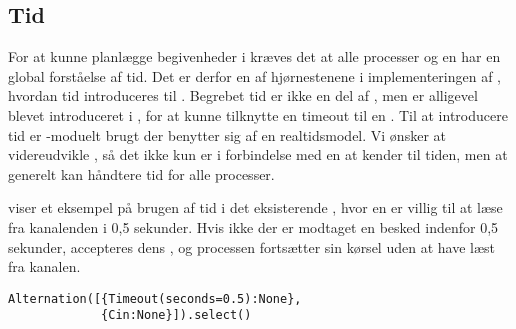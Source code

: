 \subsection{Tid} \label{sec:tid}
For at kunne planlægge begivenheder i \des kræves det at alle processer og \sched en har en global forståelse af tid.  Det er derfor en af hjørnestenene i implementeringen af \des, hvordan tid introduceres til \pycsp.  
Begrebet tid er ikke en del af \csp, men er alligevel blevet introduceret i \pycsp, for  at  kunne tilknytte en timeout til en . Til at introducere tid er -moduelt brugt der benytter sig af en realtidsmodel.  Vi ønsker
at videreudvikle \pycsp, så det ikke kun er i forbindelse med en  at \pycsp kender til tiden, men at \pycsp generelt kan håndtere tid for alle
processer.
 
 viser et eksempel på brugen af tid i det eksisterende \pycsp, hvor en  er villig
til at læse fra kanalenden  i 0,5 sekunder. Hvis ikke der
er modtaget en besked indenfor 0,5 sekunder, accepteres dens ,
og processen fortsætter sin kørsel uden at have læst fra kanalen.

\begin{lstlisting}[float=hbtp, 
label=Timeout,caption=Timeout i Alternation (fra dokumentationen til PyCSP)]
Alternation([{Timeout(seconds=0.5):None}, 
             {Cin:None}]).select()
\end{lstlisting}



